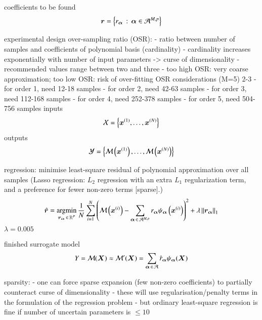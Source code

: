 coefficients to be found
\begin{equation}
    \bm r = \left\{r_{\bm{\alpha}} \,:\, {\bm{\alpha}} \in \mathcal{A}^{M,p}\right\}
\end{equation}

experimental design
over-sampling ratio (OSR):
- ratio between number of samples and coefficients of polynomial basis (cardinality) \cite{palar_multi-fidelity_2016}
- cardinality increases exponentially with number of input parameters -> curse of dimensionality
- recommended values range between two and three \cite{hosder2007,palar_multi-fidelity_2016,fajraoui_optimal_2017,gratiet_metamodel-based_2015}
- too high OSR: very coarse approximation; too low OSR: risk of over-fitting \cite{palar_multi-fidelity_2016}
OSR considerations (M=5) 2-3
- for order 1, need 12-18 samples
- for order 2, need 42-63 samples
- for order 3, need 112-168 samples
- for order 4, need 252-378 samples
- for order 5, need 504-756 samples
inputs
\begin{equation}
    \mathcal{X} = \left\{ \bm x^{(1)},\dots,\bm x^{(N)} \right\}
\end{equation}
outputs
\begin{equation}
    \mathcal{Y} = \left\{ \mathcal{M}\left(\bm x^{(1)}\right),\dots,\mathcal{M}\left(\bm x^{(N)}\right) \right\}
\end{equation}

regression: minimise least-square residual of polynomial approximation over all samples (Lasso regression: $L_2$ regression with an extra $L_1$ regularization term, and a preference for fewer non-zero terms [sparse].)
\begin{equation}
    \hat{\bm{r}} = \operatorname*{\arg\!\min}_{\bm{r}_{\bm{\alpha}} \,\in\, \mathbb{R}^P} \frac{1}{N} \sum_{i=1}^N \left(
        \mathcal{M} \left(\bm x^{(i)}\right) - \sum_{{\bm{\alpha}} \,\in\, \mathcal{A}^{M,p}} r_{\bm{\alpha}} \psi_{\bm{\alpha}}\left(\bm x^{(i)}\right)
    \right)^2  + \lambda \left\lVert\bm{r}_{\bm{\alpha}}\right\rVert_1
\end{equation}
$\lambda=0.005$

finished surrogate model
\begin{equation}
    Y = \mathcal{M}(\bm X) \approx \mathcal{M}'(\bm X) = \sum_{{\bm{\alpha}} \,\in\, \mathcal{A}} \hat{r}_{\bm{\alpha}} \psi_{\bm{\alpha}} (\bm X)
\end{equation}

sparsity:
- one can force sparse expansion (few non-zero coefficients) to partially counteract curse of dimensionality \cite{gratiet_metamodel-based_2015}
- these will use regularisation/penalty terms in the formulation of the regression problem
- but ordinary least-square regression is fine if number of uncertain parameters is $\leq 10$ \cite{gratiet_metamodel-based_2015}

